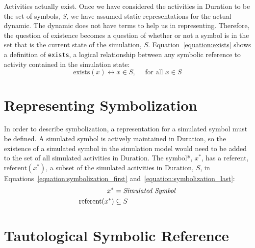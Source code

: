 Activities actually exist.  Once we have considered the activities in
Duration to be the set of symbols, $S$, we have assumed static
representations for the actual dynamic.  The dynamic does not have
terms to help us in representing.  Therefore, the question of
existence becomes a question of whether or not a symbol is in the set
that is the current state of the simulation, $S$.
Equation~\ref{equation:exists} shows a definition of {\tt exists}, a
logical relationship between any symbolic reference to activity
contained in the simulation state:
\begin{equation}
\label{equation:exists}
\text{exists}(x) \longleftrightarrow x{\in}S, \text{ ~~~for all }x{\in}S
\end{equation}

\section{Representing Symbolization}

In order to describe symbolization, a representation for a simulated
symbol must be defined.  A simulated symbol is actively maintained in
Duration, so the existence of a simulated symbol in the simulation
model would need to be added to the set of all simulated activities in
Duration.  The symbol*, $x^*$, has a referent, $\text{referent}(x^*)$,
a subset of the simulated activities in Duration, $S$, in
Equations~\ref{equation:symbolization_first}
and~\ref{equation:symbolization_last}:
\begin{align}
\label{equation:symbolization_first}
                 x^* &= \text{\emph{Simulated Symbol}} \\
\text{referent}(x^*) &\subseteq S
\label{equation:symbolization_last}
\end{align}


\section{Tautological Symbolic Reference}

